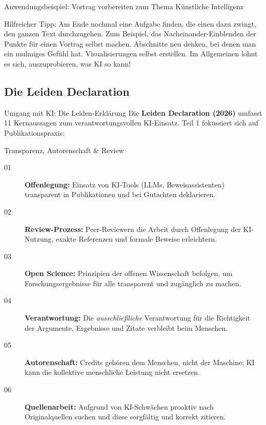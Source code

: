 \documentclass[aspectratio=\BeamerAspectRatio]{beamer}
\begin{document}
\begin{frame}{Anwendungsbeispiel: Vortrag vorbereiten zum Thema Künstliche Intelligenz}

Hilfreicher Tipp: Am Ende nochmal eine Aufgabe finden, die einen dazu zwingt, den ganzen Text durchzugehen. Zum Beispiel, das Nacheinander-Einblenden der Punkte für einen Vortrag selbst machen. Abschnitte neu denken, bei denen man ein mulmiges Gefühl hat. Visualisierungen selbst erstellen. Im Allgemeinen lohnt es sich, auszuprobieren, was KI so kann!
\end{frame}

\subsection{Die Leiden Declaration}
\begin{frame}[fragile]{Umgang mit KI: Die Leiden-Erklärung}
    \footnotesize
    Die \textbf{Leiden Declaration (2026)} umfasst 11 Kernaussagen zum verantwortungsvollen KI-Einsatz. Teil 1 fokussiert sich auf Publikationspraxis:

    \vspace{0.5em}
    \begin{exampleblock}{Transparenz, Autorenschaft \& Review}
        \begin{description}
            \item[01] \textbf{Offenlegung:} Einsatz von KI-Tools (LLMs, Beweisassistenten) transparent in Publikationen und bei Gutachten deklarieren.
            \item[02] \textbf{Review-Prozess:} Peer-Reviewern die Arbeit durch Offenlegung der KI-Nutzung, exakte Referenzen und formale Beweise erleichtern.
            \item[03] \textbf{Open Science:} Prinzipien der offenen Wissenschaft befolgen, um Forschungsergebnisse für alle transparent und zugänglich zu machen.
            \item[04] \textbf{Verantwortung:} Die \textit{ausschließliche} Verantwortung für die Richtigkeit der Argumente, Ergebnisse und Zitate verbleibt beim Menschen.
            \item[05] \textbf{Autorenschaft:} Credits gehören dem Menschen, nicht der Maschine; KI kann die kollektive menschliche Leistung nicht ersetzen.
            \item[06] \textbf{Quellenarbeit:} Aufgrund von KI-Schwächen proaktiv nach Originalquellen suchen und diese sorgfältig und korrekt zitieren.
        \end{description}
    \end{exampleblock}
\end{frame}
\end{document}
